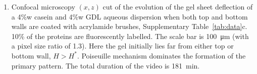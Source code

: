 \documentclass[twocolumn,superscriptaddress,showpacs,preprintnumbers,
amsmath,amssymb,prl]{revtex4-1}
\begin{document}
\begin{enumerate}
\item\label{vid:cutPoiseuille} Confocal microscopy $(x,z)$ cut of the evolution of the gel sheet deflection of a 4\%w casein and 4\%w GDL aqueous dispersion when both top and bottom walls are coated with acrylamide brushes, Supplementary Table~\ref{tab:data}c. 10\% of the proteins are fluorescently labelled. The scale bar is \SI{100}{\micro\metre} (with a pixel size ratio of 1.3). Here the gel initially lies far from either top or bottom wall, $H>H^*$. Poiseuille mechanism dominates the formation of the primary pattern. The total duration of the video is \SI{181}{\minute}.

\end{enumerate}
\end{document}

